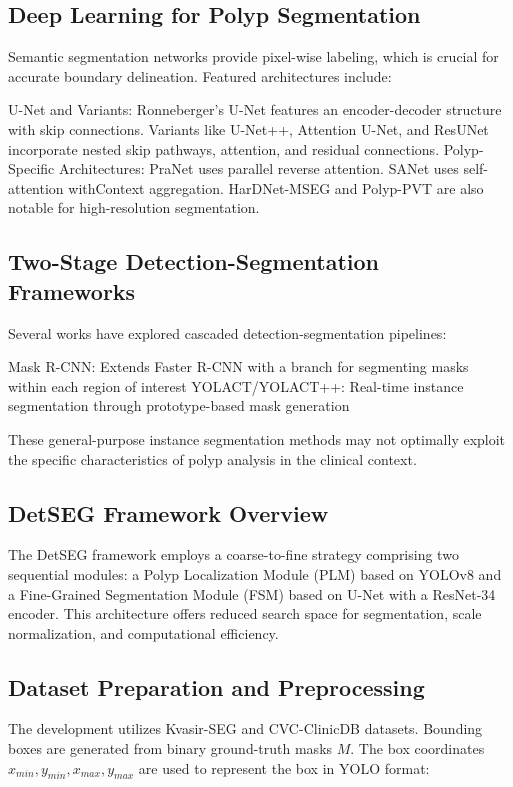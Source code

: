 \documentclass[11pt,a4paper]{article}
\begin{document}
\subsection{Deep Learning for Polyp Segmentation}
Semantic segmentation networks provide pixel-wise labeling, which is crucial for accurate boundary delineation. Featured architectures include:

U-Net and Variants: Ronneberger's U-Net features an encoder-decoder structure with skip connections. Variants like U-Net++, Attention U-Net, and ResUNet incorporate nested skip pathways, attention, and residual connections.
Polyp-Specific Architectures: PraNet uses parallel reverse attention. SANet uses self-attention withContext aggregation. HarDNet-MSEG and Polyp-PVT are also notable for high-resolution segmentation.

\subsection{Two-Stage Detection-Segmentation Frameworks}
Several works have explored cascaded detection-segmentation pipelines:

Mask R-CNN: Extends Faster R-CNN with a branch for segmenting masks within each region of interest
YOLACT/YOLACT++: Real-time instance segmentation through prototype-based mask generation

These general-purpose instance segmentation methods may not optimally exploit the specific characteristics of polyp analysis in the clinical context.


\subsection{DetSEG Framework Overview}
The DetSEG framework employs a coarse-to-fine strategy comprising two sequential modules: a Polyp Localization Module (PLM) based on YOLOv8 and a Fine-Grained Segmentation Module (FSM) based on U-Net with a ResNet-34 encoder. This architecture offers reduced search space for segmentation, scale normalization, and computational efficiency.

\subsection{Dataset Preparation and Preprocessing}
The development utilizes Kvasir-SEG and CVC-ClinicDB datasets. Bounding boxes are generated from binary ground-truth masks $M$. The box coordinates $x_{min}, y_{min}, x_{max}, y_{max}$ are used to represent the box in YOLO format:
\end{document}
